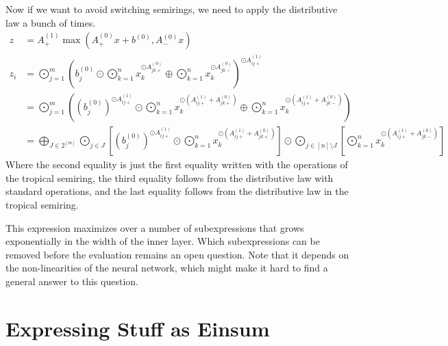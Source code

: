 Now if we want to avoid switching semirings, we need to apply the distributive law a bunch of times.
\begin{align*}
    z   & = A^{(1)}_+ \max(A^{(0)}_+ x + b^{(0)}, A^{(0)}_- x)                                                                                                                                                                                                                                                                                                          \\
    z_i & = \bigodot\limits_{j = 1}^{m}\left(b^{(0)}_j \odot \bigodot\limits_{k = 1}^{n} x_k^{\odot A^{(0)}_{jk+}} \oplus \bigodot\limits_{k = 1}^{n} x_k^{\odot A^{(0)}_{jk-}}\right)^{\odot A^{(1)}_{ij+}}                                                                                                                                                            \\
        & = \bigodot\limits_{j = 1}^{m}\left(\left(b^{(0)}_j\right)^{\odot A^{(1)}_{ij+}} \odot \bigodot\limits_{k = 1}^{n} x_k^{\odot \left(A^{(1)}_{ij+} + A^{(0)}_{jk+}\right)} \oplus \bigodot\limits_{k = 1}^{n} x_k^{\odot \left(A^{(1)}_{ij+} + A^{(0)}_{jk-}\right)}\right)                                                                                     \\
        & = \bigoplus\limits_{J \in 2^{[m]}} \bigodot\limits_{j \in J} \left[\left(b^{(0)}_j\right)^{\odot A^{(1)}_{ij+}} \odot \bigodot\limits_{k = 1}^{n} x_k^{\odot \left(A^{(1)}_{ij+} + A^{(0)}_{jk+}\right)}\right] \odot \bigodot\limits_{j \in [n] \setminus J} \left[\bigodot\limits_{k = 1}^{n} x_k^{\odot \left(A^{(1)}_{ij+} + A^{(0)}_{jk-}\right)}\right]
\end{align*}
Where the second equality is just the first equality written with the operations of the tropical semiring,
the third equality follows from the distributive law with standard operations,
and the last equality follows from the distributive law in the tropical semiring.

This expression maximizes over a number of subexpressions that grows exponentially in the width of the inner layer.
Which subexpressions can be removed before the evaluation remains an open question.
Note that it depends on the non-linearities of the neural network, which might make it hard to find a general answer to this question.

\section{Expressing Stuff as Einsum}

